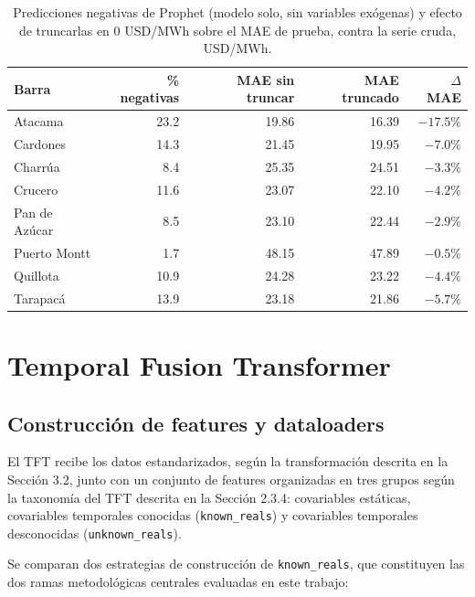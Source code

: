 \begin{table}[htbp]
    \centering
    \small
    \begin{tabular}{lrrrr}
        \toprule
        Barra & \% negativas & MAE sin truncar & MAE truncado & $\Delta$ MAE \\
        \midrule
        Atacama       & 23.2 & 19.86 & 16.39 & $-17.5\%$ \\
        Cardones      & 14.3 & 21.45 & 19.95 & $-7.0\%$ \\
        Charrúa       & 8.4  & 25.35 & 24.51 & $-3.3\%$ \\
        Crucero       & 11.6 & 23.07 & 22.10 & $-4.2\%$ \\
        Pan de Azúcar & 8.5  & 23.10 & 22.44 & $-2.9\%$ \\
        Puerto Montt  & 1.7  & 48.15 & 47.89 & $-0.5\%$ \\
        Quillota      & 10.9 & 24.28 & 23.22 & $-4.4\%$ \\
        Tarapacá      & 13.9 & 23.18 & 21.86 & $-5.7\%$ \\
        \bottomrule
    \end{tabular}
    \caption{Predicciones negativas de Prophet (modelo solo, sin variables exógenas) y efecto de truncarlas en 0 USD/MWh sobre el MAE de prueba, contra la serie cruda, USD/MWh.}
    \label{tab:prophet_negativas}
\end{table}

\section{Temporal Fusion Transformer}

\subsection{Construcción de features y dataloaders}

El TFT recibe los datos estandarizados, según la transformación descrita en la Sección 3.2, junto con un conjunto de features organizadas en tres grupos según la taxonomía del TFT descrita en la Sección 2.3.4: covariables estáticas, covariables temporales conocidas (\texttt{known\_reals}) y covariables temporales desconocidas (\texttt{unknown\_reals}).

Se comparan dos estrategias de construcción de \texttt{known\_reals}, que constituyen las dos ramas metodológicas centrales evaluadas en este trabajo:

